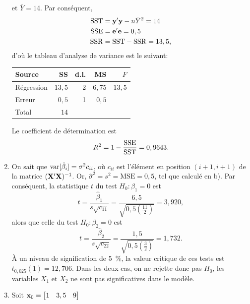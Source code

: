 \begin{solution}{3.7}
\begin{enumerate}
      et $\bar{Y} = 14$. Par conséquent,
      \begin{align*}
        \mathrm{SST}
        &= \mathbf{y}^\prime \mathbf{y} - n \bar{Y}^2 = 14 \\
        \mathrm{SSE}
        &= \mathbf{e}^\prime \mathbf{e} = 0,5 \\
        \mathrm{SSR} &= \mathrm{SST} - \mathrm{SSR} = 13,5,
      \end{align*}
      d'où le tableau d'analyse de variance est le suivant:
      \begin{center}
        \begin{tabular}{lrrrr}
          \toprule
          Source & SS & d.l. & MS & $F$ \\
          \midrule
          Régression & $13,5$ & 2 & $6,75$ &  $13,5$ \\
          Erreur     &  $0,5$ & 1 &  $0,5$ \\
          \midrule
          Total      &   $14$ & \\
          \bottomrule
        \end{tabular}
      \end{center}
      Le coefficient de détermination est
      \begin{displaymath}
        R^2 = 1 - \frac{\mathrm{SSE}}{\mathrm{SST}} = 0,9643.
      \end{displaymath}
    \item On sait que $\mathrm{var} [ \hat{\beta}_i ] = \sigma^2 c_{ii}$, où
      $c_{ii}$ est l'élément en position $(i+1, i+1)$ de la matrice
      $(\mathbf{X}^\prime \mathbf{X})^{-1}$. Or, $\hat{\sigma}^2 = s^2 =
      \text{MSE} = 0,5$, tel que calculé en b). Par conséquent, la
      statistique $t$ du test $H_0: \beta_1 = 0$ est
      \begin{displaymath}
        t
        = \frac{\hat{\beta}_1}{s \sqrt{c_{11}}}
        = \frac{6,5}{\sqrt{0,5 (\frac{11}{2})}}
        = 3,920,
      \end{displaymath}
      alors que celle du test $H_0: \beta_2 = 0$ est
      \begin{displaymath}
        t
        = \frac{\hat{\beta}_2}{s \sqrt{c_{22}}}
        = \frac{1,5}{\sqrt{0,5 (\frac{3}{2})}}
        = 1,732.
      \end{displaymath}
      À un niveau de signification de 5~\%, la valeur critique de ces
      tests est $t_{0,025}(1) = 12,706$. Dans les deux cas, on ne
      rejette donc pas $H_0$, les variables $X_1$ et $X_2$ ne sont pas
      significatives dans le modèle.
    \item Soit $\mathbf{x}_0 = \begin{bmatrix} 1 & 3,5 & 9 \end{bmatrix}$

\end{enumerate}
\end{solution}

